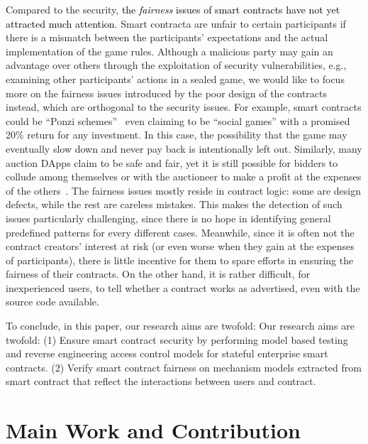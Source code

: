 Compared to the security, \textcolor{black}{the \emph{fairness} issues of smart contracts have not yet attracted much attention}.
Smart contracta are unfair to certain participants if there is a mismatch between the participants' expectations and the actual implementation of the game rules.
Although a malicious party may gain an advantage over others through the exploitation of security vulnerabilities, e.g., examining other participants' actions in a sealed game,
we would like to focus more on the fairness issues introduced by the poor design of the contracts instead, which are orthogonal to the security issues.
For example, smart contracts could be ``Ponzi schemes''~\cite{BARTOLETTI2020259} even claiming to be ``social games'' with a promised 20\% return for any investment.
In this case, the possibility that the game may eventually slow down and never pay back is intentionally left out.
Similarly, many auction DApps claim to be safe and fair, yet it is still possible for bidders to collude among themselves or with the auctioneer to make a profit at the expenses of the others~\cite{wu2018cream}.
The fairness issues mostly reside in contract logic: some are design defects, while the rest are careless mistakes.
This makes the detection of such issues particularly challenging, since there is no hope in identifying general predefined patterns for every different cases.
Meanwhile, since it is often not the contract creators' interest at risk (or even worse when they gain at the expenses of participants), there is little incentive for them to spare efforts in ensuring the fairness of their contracts.
On the other hand, it is rather difficult, for inexperienced users, to tell whether a contract works as advertised, even with the source code available.

To conclude, in this paper, our research aims are twofold: Our research aims are twofold: (1) Ensure smart contract security by performing model based testing and reverse engineering access control models for stateful enterprise smart contracts. 
(2) Verify smart contract fairness on mechanism models extracted from smart contract that reflect the interactions between users and contract.


\section{Main Work and Contribution}

